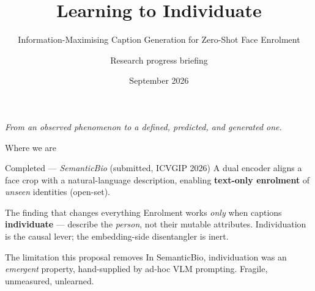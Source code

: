 \documentclass[aspectratio=169,10pt]{beamer}
\title[Learning to Individuate]{Learning to Individuate}
\subtitle{Information-Maximising Caption Generation for Zero-Shot Face Enrolment}
\author[Research progress briefing]{Research progress briefing}
\institute[]{Toward ICCV 2027 \,\textbullet\, building on \emph{SemanticBio} (ICVGIP 2026)}
\date{September 2026}
\begin{document}
\begin{frame}[plain]
  \titlepage
  \begin{center}
    \footnotesize\itshape
    From an \emph{observed} phenomenon to a \emph{defined, predicted, and generated} one.
  \end{center}
\end{frame}

\begin{frame}{Where we are}
  \begin{block}{Completed --- \emph{SemanticBio} (submitted, ICVGIP 2026)}
    A dual encoder aligns a face crop with a natural-language description, enabling
    \textbf{text-only enrolment} of \emph{unseen} identities (open-set).
  \end{block}
  \begin{block}{The finding that changes everything}
    Enrolment works \emph{only} when captions \textbf{individuate} --- describe the
    \emph{person}, not their mutable attributes. Individuation is the causal lever;
    the embedding-side disentangler is inert.
  \end{block}
  \begin{alertblock}{The limitation this proposal removes}
    In SemanticBio, individuation was an \emph{emergent} property, hand-supplied by
    ad-hoc VLM prompting. Fragile, unmeasured, unlearned.
  \end{alertblock}
\end{frame}
\end{document}

